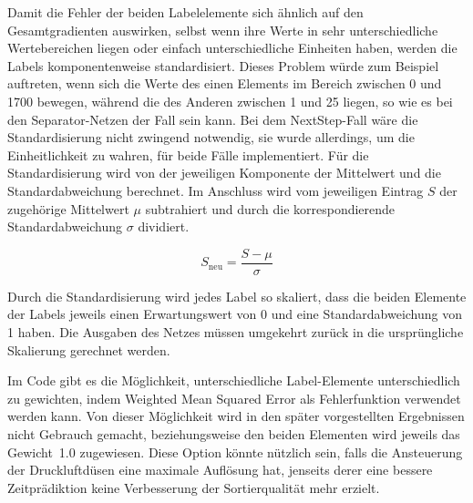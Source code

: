 Damit die Fehler der beiden Labelelemente sich ähnlich auf den Gesamtgradienten auswirken,
selbst wenn ihre Werte in sehr unterschiedliche Wertebereichen liegen oder einfach unterschiedliche Einheiten haben, werden die Labels komponentenweise standardisiert.
Dieses Problem würde zum Beispiel auftreten, wenn sich die Werte des einen Elements im Bereich zwischen 0 und 1700 bewegen, während die des Anderen zwischen 1 und 25 liegen,
so wie es bei den Separator-Netzen der Fall sein kann.
Bei dem NextStep-Fall wäre die Standardisierung nicht zwingend notwendig, 
sie wurde allerdings, um die Einheitlichkeit zu wahren, für beide Fälle implementiert. 
Für die Standardisierung wird von der jeweiligen Komponente der Mittelwert und die Standardabweichung berechnet. 
Im Anschluss wird vom jeweiligen Eintrag \(S\) der zugehörige Mittelwert \(\mu\) subtrahiert und durch die korrespondierende Standardabweichung \(\sigma\) dividiert.
	
\begin{equation*}
	S_{\text{neu}} = \frac{S - \mu}{\sigma} %
\end{equation*}

Durch die Standardisierung wird jedes Label so skaliert, dass die beiden Elemente der Labels jeweils einen Erwartungswert von 0 und eine Standardabweichung von 1 haben.
Die Ausgaben des Netzes müssen umgekehrt zurück in die ursprüngliche Skalierung gerechnet werden.

Im Code gibt es die Möglichkeit, unterschiedliche Label-Elemente unterschiedlich zu gewichten, indem Weighted Mean Squared Error als Fehlerfunktion verwendet werden kann. 
Von dieser Möglichkeit wird in den später vorgestellten Ergebnissen nicht Gebrauch gemacht, beziehungsweise den beiden Elementen wird jeweils das Gewicht~1.0 zugewiesen.
Diese Option könnte nützlich sein, falls die Ansteuerung der Druckluftdüsen eine maximale Auflösung hat, jenseits derer eine bessere Zeitprädiktion keine Verbesserung der Sortierqualität mehr erzielt.


